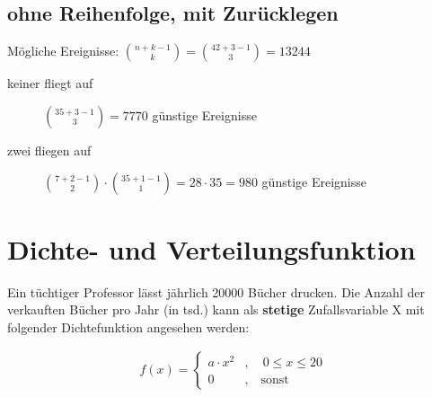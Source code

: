 \documentclass[11pt, a4paper]{article}
\begin{document}
\subsection{ohne Reihenfolge, mit Zurücklegen}
Mögliche Ereignisse: $\binom{n+k-1}{k} = \binom{42+3-1}{3} = 13244$
\begin{description}
	\item[keiner fliegt auf] $\binom{35+3-1}{3} = 7770$ günstige Ereignisse
	\item[zwei fliegen auf] $\binom{7+2-1}{2} \cdot \binom{35+1-1}{1} = 28 \cdot 35 = 980$ günstige Ereignisse
\end{description}

\newpage
\section{Dichte- und Verteilungsfunktion} %

Ein tüchtiger Professor lässt jährlich 20000 Bücher drucken. Die Anzahl der verkauften Bücher pro Jahr (in tsd.) kann als \textbf{stetige} Zufallsvariable X mit folgender Dichtefunktion angesehen werden:

\begin{align*}
f(x) = \begin{cases}a \cdot x^2 & , \quad 0 \leq x \leq 20\\ 0 & , \quad \text{sonst}\end{cases}
\end{align*}
\end{document}
